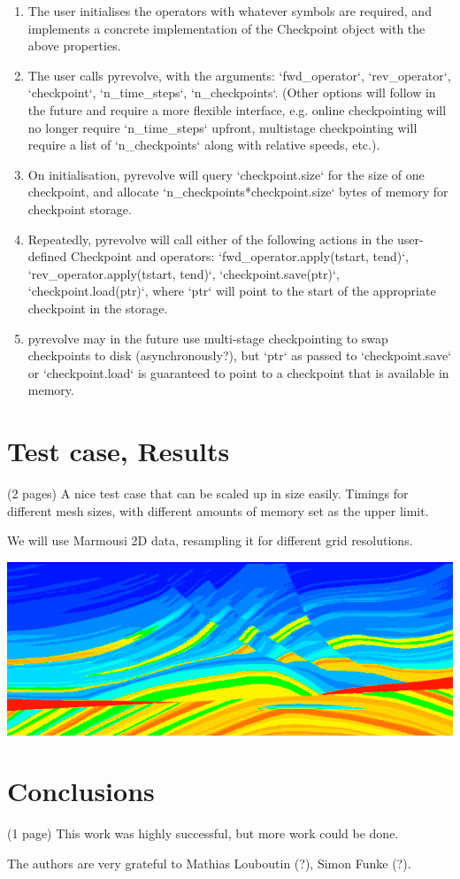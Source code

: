 \documentclass[sigconf]{acmart}
\begin{document}
\begin{enumerate}
\item The user initialises the operators with whatever symbols are required, and implements a
concrete
implementation of the Checkpoint object with the above properties.
\item The user calls pyrevolve, with the arguments: `fwd\_operator`, `rev\_operator`, `checkpoint`,
`n\_time\_steps`, `n\_checkpoints`. (Other options will follow in the future and require a more
flexible interface, e.g. online checkpointing will no longer require `n\_time\_steps` upfront,
multistage checkpointing will require a list of `n\_checkpoints` along with relative speeds, etc.).
\item On initialisation, pyrevolve will query `checkpoint.size` for the size of one checkpoint, and
allocate `n\_checkpoints*checkpoint.size` bytes of memory for checkpoint storage.
\item Repeatedly, pyrevolve will call either of the following actions in the user-defined Checkpoint
and operators: `fwd\_operator.apply(tstart, tend)`, `rev\_operator.apply(tstart, tend)`,
`checkpoint.save(ptr)`, `checkpoint.load(ptr)`, where `ptr` will point to the start of the
appropriate checkpoint in the storage.
\item pyrevolve may in the future use multi-stage checkpointing to swap checkpoints to disk
(asynchronously?), but `ptr` as passed to `checkpoint.save` or `checkpoint.load` is guaranteed to
point to a checkpoint that is available in memory.
\end{enumerate}


\section{Test case, Results}
(2 pages)
\label{sec:experiment}
A nice test case that can be scaled up in size easily. Timings for different mesh sizes, with
different amounts of memory set as the upper limit.

We will use Marmousi 2D data, resampling it for different grid
resolutions. 

\includegraphics[width=0.8\linewidth]{images/marmousi_velocity.png} 

\section{Conclusions}
(1 page)
This work was highly successful, but more work could be done.

\begin{acks}
  The authors are very grateful to Mathias Louboutin (?), Simon Funke
  (?). 
\end{acks}



 
\end{document}
